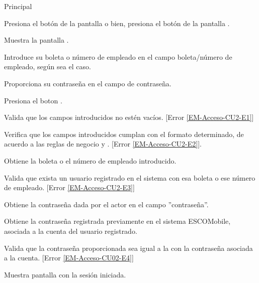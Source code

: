 	\begin{UCtrayectoria}{Principal}

		\UCpaso [\UCactor] Presiona el botón  de la pantalla  o bien, presiona el botón  de la pantalla .
		
		\UCpaso Muestra la pantalla . \label{l_Acceso_CU2_E1}
		
		\UCpaso[\UCactor] Introduce su boleta o número de empleado en el campo boleta/número de empleado, según sea el caso.
		
		\UCpaso[\UCactor] Proporciona su contraseña en el campo de contraseña.
		
		\UCpaso[\UCactor] Presiona el boton .
		
		\UCpaso Valida que los campos introducidos no estén vacíos. [Error \ref{EM-Acceso-CU2-E1}]
		
		\UCpaso Verifica que los campos introducidos cumplan con el formato determinado, de acuerdo a las reglas de negocio  y . [Error \ref{EM-Acceso-CU2-E2}].
		
		\UCpaso Obtiene la boleta o el número de empleado introducido.
		
		\UCpaso Valida que exista un usuario registrado en el sistema con esa boleta o ese número de empleado. [Error \ref{EM-Acceso-CU2-E3}]

		\UCpaso Obtiene la contraseña dada por el actor en el campo ''contraseña''.
		
		\UCpaso Obtiene la contraseña registrada previamente en el sistema ESCOMobile, asociada a la cuenta del usuario registrado.

		\UCpaso Valida que la contraseña proporcionada sea igual a la con la contraseña asociada a la cuenta. [Error \ref{EM-Acceso-CU02-E4}]
		
		\UCpaso Muestra pantalla  con la sesión iniciada.
	\end{UCtrayectoria}
		
